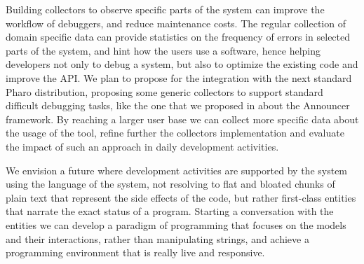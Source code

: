  Building collectors to observe specific parts of the system can improve the workflow of debuggers, and reduce maintenance costs.
The regular collection of domain specific data can provide statistics on the frequency of errors in selected parts of the system, and hint how the users use a software, hence helping developers not only to debug a system, but also to optimize the existing code and improve the API.
We plan to propose \sln for the integration with the next standard Pharo distribution, proposing some generic collectors to support standard difficult debugging tasks, like the one that we proposed in  about the Announcer framework.
By reaching a larger user base we can collect more specific data about the usage of the tool, refine further the collectors implementation and evaluate the impact of such an approach in daily development activities.

We envision a future where development activities are supported by the system using the language of the system, not resolving to flat and bloated chunks of plain text that represent the side effects of the code, but rather first-class entities that narrate the exact status of a program.
Starting a conversation with the entities we can develop a paradigm of programming that focuses on the models and their interactions, rather than manipulating strings, and achieve a programming environment that is really live and responsive.



